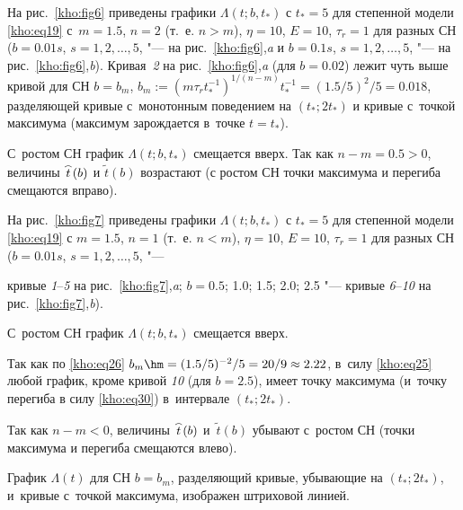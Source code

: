 На рис.~\ref{kho:fig6} приведены графики $\Lambda(t;b,t_\ast)$ с $t_\ast=5$ для степенной модели \eqref{kho:eq19} с~$m=1.5$, $n=2$ (т.~е. $n>m$), $\eta=10$, $E=10$, $\tau_r=1$ для разных СН ($b=0.01s$, $s=1, 2,\dots,5$, "--- на рис.~\ref{kho:fig6},{\sl a} и $b=0.1s$, $s=1, 2,\dots,5$, "--- на рис.~\ref{kho:fig6},{\sl b}). Кривая~{\sl 2} на рис.~\ref{kho:fig6},{\sl a} (для $b=0.02$) лежит чуть выше кривой для СН $b=b_m$, \linebreak $b_m:=(m\tau_rt_\ast^{-1})^{1/(n-m)}t_\ast^{-1}=(1.5/5)^2/5=0.018$, разделяющей кривые с~монотонным поведением на $(t_\ast;2t_\ast)$ и кривые с~точкой максимума (максимум зарождается в~точке $t=t_\ast$). 

С~ростом СН график $\Lambda(t;b,t_\ast)$ смещается вверх. Так как $n-m=0.5>0$, величины $\mathord{\buildrel{\lower3pt\hbox{$\scriptscriptstyle\frown$}}\over {t}}(b)$ и $\tilde{t}(b)$ возрастают (с ростом СН точки максимума и перегиба смещаются вправо).



На рис.~\ref{kho:fig7} приведены графики $\Lambda(t;b,t_\ast)$ с $t_\ast=5$ для степенной модели \eqref{kho:eq19} с $m=1.5$, $n=1$ (т.~е. $n<m$), $\eta=10$, $E=10$, $\tau_r=1$ для разных СН ($b=0.01s$, $s=1, 2,\dots, 5$, "--- 

кривые {\sl 1}--{\sl 5}  на рис.~\ref{kho:fig7},{\sl a}; $b=0.5$; 1.0; 1.5; 2.0; 2.5  "--- кривые {\sl 6}--{\sl 10}  на рис.~\ref{kho:fig7},{\sl b}). 

С~ростом СН график $\Lambda(t;b,t_\ast)$ смещается вверх. 

Так как по \eqref{kho:eq26}  $b_m\hm =(1.5/5)^{-2}/5=20/9\approx2.22$, в~силу \eqref{kho:eq25} любой график, кроме кривой {\sl 10} (для $b=2.5$), имеет точку максимума (и~точку перегиба в силу \eqref{kho:eq30}) в~интервале $(t_\ast; 2t_\ast)$. 

Так как $n-m<0$, величины $\mathord{\buildrel{\lower3pt\hbox{$\scriptscriptstyle\frown$}}\over{t}}(b)$ и~$\tilde{t}(b)$ убывают с~ростом СН (точки максимума и перегиба смещаются влево). 

График $\Lambda(t)$ для СН $b=b_m$, разделяющий кривые, убывающие на $(t_\ast;2t_\ast)$, и~кривые с~точкой максимума, изображен штриховой линией. 




